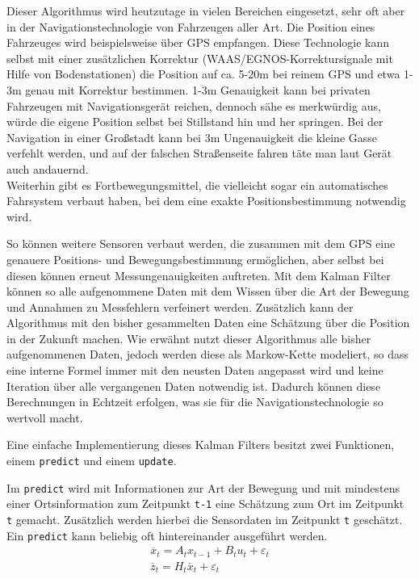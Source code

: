 \documentclass[12pt,a4paper,ngerman]{scrartcl}
\begin{document}
Dieser Algorithmus wird heutzutage in vielen Bereichen eingesetzt, sehr oft aber in der Navigationstechnologie von Fahrzeugen aller Art. Die Position eines Fahrzeuges wird beispielsweise über GPS empfangen. Diese Technologie kann selbst mit einer zusätzlichen Korrektur (WAAS/EGNOS-Korrektursignale mit Hilfe von Bodenstationen\cite{waas}\cite{egnos}) die Position auf ca. 5-20m bei reinem GPS und etwa 1-3m genau mit Korrektur bestimmen. 1-3m Genauigkeit kann bei privaten Fahrzeugen mit Navigationsgerät reichen, dennoch sähe es merkwürdig aus, würde die eigene Position selbst bei Stillstand hin und her springen. Bei der Navigation in einer Großstadt kann bei 3m Ungenauigkeit die kleine Gasse verfehlt werden, und auf der falschen Straßenseite fahren täte man laut Gerät auch andauernd.\\
Weiterhin gibt es Fortbewegungsmittel, die vielleicht sogar ein automatisches Fahrsystem verbaut haben, bei dem eine exakte Positionsbestimmung notwendig wird.

So können weitere Sensoren verbaut werden, die zusammen mit dem GPS eine genauere Positions- und Bewegungsbestimmung ermöglichen, aber selbst bei diesen können erneut Messungenauigkeiten auftreten. Mit dem Kalman Filter können so alle aufgenommene Daten mit dem Wissen über die Art der Bewegung und Annahmen zu Messfehlern verfeinert werden. Zusätzlich kann der Algorithmus mit den bisher gesammelten Daten eine Schätzung über die Position in der Zukunft machen. Wie erwähnt nutzt dieser Algorithmus alle bisher aufgenommenen Daten, jedoch werden diese als Markow-Kette modeliert, so dass eine interne Formel immer mit den neusten Daten angepasst wird und keine Iteration über alle vergangenen Daten notwendig ist. Dadurch können diese Berechnungen in Echtzeit erfolgen, was sie für die Navigationstechnologie so wertvoll macht.

Eine einfache Implementierung dieses Kalman Filters besitzt zwei Funktionen, einem {\tt predict} und einem {\tt update}.

Im {\tt predict} wird mit Informationen zur Art der Bewegung und mit mindestens einer Ortsinformation zum Zeitpunkt {\tt t-1} eine Schätzung zum Ort im Zeitpunkt {\tt t} gemacht. Zusätzlich werden hierbei die Sensordaten im Zeitpunkt {\tt t} geschätzt. Ein {\tt predict} kann beliebig oft hintereinander ausgeführt werden.
\begin{align}
\overline{x}_{t} = A_{t}x_{t-1} + B_{t}u_{t} + \varepsilon_{t} \label{eq:predict1}\\
\overline{z}_{t} = H_{t}\overline{x}_{t} + \varepsilon_{t} \label{eq:predict2}
\end{align}
\end{document}
